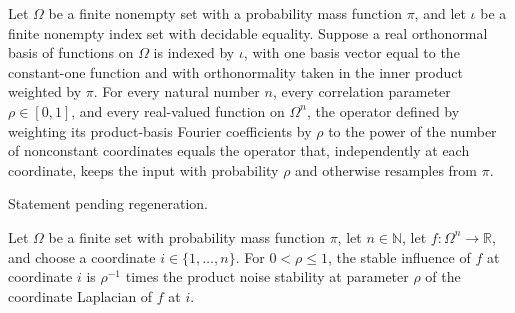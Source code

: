 \begin{theorem}
\label{FABL.spectralProductNoiseOperator_eq_productNoiseOperator}
\leanok
{}
Let $\Omega$ be a finite nonempty set with a probability mass function $\pi$, and let
$\iota$ be a finite nonempty index set with decidable equality. Suppose a real
orthonormal basis of functions on $\Omega$ is indexed by $\iota$, with one basis vector
equal to the constant-one function and with orthonormality taken in the inner product
weighted by $\pi$. For every natural number $n$, every correlation parameter
$\rho\in[0,1]$, and every real-valued function on $\Omega^n$, the operator defined by
weighting its product-basis Fourier coefficients by $\rho$ to the power of the number of
nonconstant coordinates equals the operator that, independently at each coordinate,
keeps the input with probability $\rho$ and otherwise resamples from $\pi$.
\end{theorem}

\begin{theorem}
\label{FABL.productNoiseOperator_semigroup}
\leanok
{}
Statement pending regeneration.
\end{theorem}

\begin{definition}
\label{FABL.productStableInfluence}
\leanok
{}
Let $\Omega$ be a finite set with probability mass function $\pi$, let $n\in\mathbb{N}$,
let $f\colon\Omega^n\to\mathbb{R}$, and choose a coordinate $i\in\{1,\ldots,n\}$. For
$0<\rho\leq1$, the stable influence of $f$ at coordinate $i$ is $\rho^{-1}$ times the
product noise stability at parameter $\rho$ of the coordinate Laplacian of $f$ at $i$.
\end{definition}

